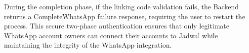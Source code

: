 During the completion phase, if the linking code validation fails, the Backend returns a CompleteWhatsApp failure response, requiring the user to restart the process. This secure two-phase authentication ensures that only legitimate WhatsApp account owners can connect their accounts to Jadwal while maintaining the integrity of the WhatsApp integration.